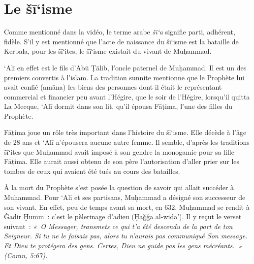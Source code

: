 \chapter{Le šī`isme}



Comme mentionné dans la vidéo, le terme arabe \emph{šī`a} signifie
parti, adhérent, fidèle. S'il y est mentionné que l'acte de naissance du
šī`isme est la bataille de Kerbala, pour les šī`ites, le šī`isme
existait du vivant de Muḥammad.

`Alī en effet est le fils d'Abū Ṭālib, l'oncle paternel de Muḥammad. Il
est un des premiers convertis à l'islam. La tradition sunnite mentionne
que le Prophète lui avait confié (amāna) les biens des personnes dont il
était le représentant commercial et financier peu avant l'Hégire, que le
soir de l'Hégire, lorsqu'il quitta La Mecque, `Alī dormit dans son lit,
qu'il épousa Fāṭima, l'une des filles du Prophète.

Fāṭima joue un rôle très important dans l'histoire du šī`isme. Elle
décède à l'âge de 28 ans et `Alī n'épousera aucune autre femme. Il
semble, d'après les traditions šī`ites que Muḥammad avait imposé à son
gendre la monogamie pour sa fille Fāṭima. Elle aurait aussi obtenu de
son père l'autorisation d'aller prier sur les tombes de ceux qui avaient
été tués au cours des batailles.

À la mort du Prophète s'est posée la question de savoir qui allait
succéder à Muḥammad. Pour `Alī et ses partisans, Muḥammad a désigné son
successeur de son vivant. En effet, peu de temps avant sa mort, en 632,
Muḥammad se rendit à Ġadir Ḫumm~: c'est le pèlerinage d'adieu (Ḥaǧǧa
al-widā'). Il y reçut le verset suivant~: \emph{«~O Messager, transmets
ce qui t'a été descendu de la part de ton Seigneur. Si tu ne le faisais
pas, alors tu n'aurais pas communiqué Son message. Et Dieu te protégera
des gens. Certes, Dieu ne guide pas les gens mécréants.~» (Coran,
5:67).}

